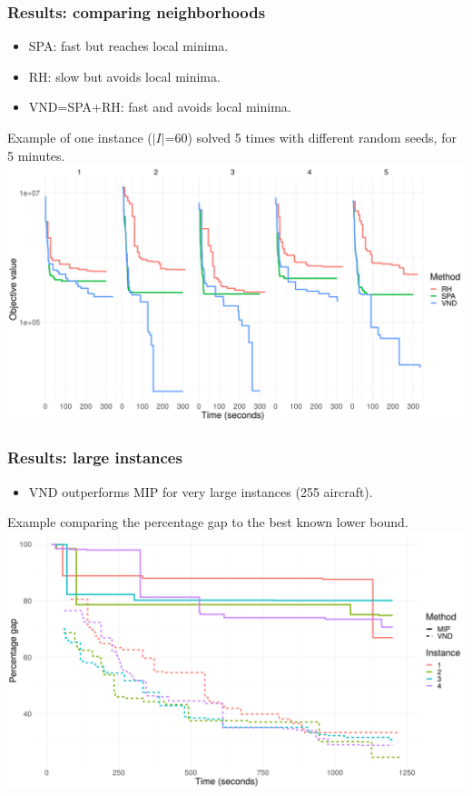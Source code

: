 \begin{frame}
\frametitle{\textbf{Results: comparing neighborhoods}}
  \begin{itemize}
    \item SPA: fast but reaches local minima.
    \item RH: slow but avoids local minima.
    \item VND=SPA+RH: fast and avoids local minima.
  \end{itemize}

  \begin{block}{}
    Example of one instance ($|I|$=60) solved 5 times with different random seeds, for 5 minutes.
    \includegraphics[width=0.8\linewidth]{images/compare_neighbors.png}
  \end{block}
\end{frame}

\begin{frame}
\frametitle{\textbf{Results: large instances}}
  \begin{itemize}
    \item VND outperforms MIP for very large instances (255 aircraft).
  \end{itemize}

  \begin{block}{}
    Example comparing the percentage gap to the best known lower bound.
    \includegraphics[width=\linewidth]{images/progress_gaps_very_large_255.png}  
  \end{block}{}
\end{frame}

